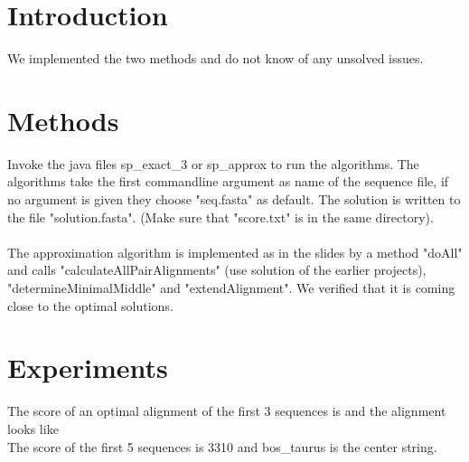 \documentclass[12pt,a4paper]{article}
\begin{document}
	\section{Introduction}
	We implemented the two methods and do not know of any unsolved issues.

	\section{Methods}
	Invoke the java files sp_exact_3 or sp_approx to run the algorithms. The algorithms take the first commandline argument as name of the sequence file, if no argument is given they choose "seq.fasta" as default. The solution is written to the file "solution.fasta". (Make sure that "score.txt" is in the same directory).
	\\
	\\
	The approximation algorithm is implemented as in the slides by a method "doAll" and calls "calculateAllPairAlignments" (use solution of the earlier projects), "determineMinimalMiddle" and "extendAlignment". We verified that it is coming close to the optimal solutions.
	
	\section{Experiments}
	The score of an optimal alignment of the first 3 sequences is %
	and the alignment looks like %
	\\
	The score of the first 5 sequences is 3310 and bos\_taurus is the center string.
	\\
	
\end{document}
